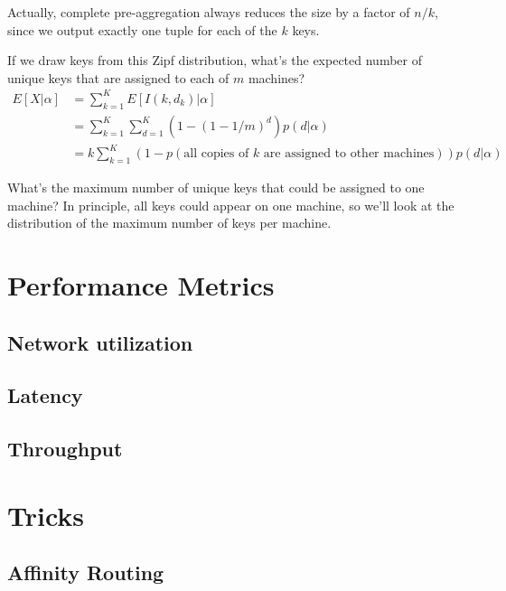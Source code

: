 \documentclass[12pt]{article}
\begin{document}
Actually, complete pre-aggregation always reduces the size by a factor of $n/k$, since we output exactly one tuple for each of the $k$ keys.


If we draw keys from this Zipf distribution, what's the expected number of unique keys that are assigned to each of $m$ machines?
\begin{align*}
    E[X|\alpha] &= \sum_{k=1}^K E[I(k, d_k) | \alpha]
\\              &= \sum_{k=1}^K \sum_{d=1}^K \left(1 - \left(1 - 1/m\right)^d\right)p(d | \alpha)
\\              &= k \sum_{k=1}^K\left(1 - p\left(\text{all copies of $k$ are assigned to other machines}\right)\right) p(d | \alpha)
\end{align*}

What's the maximum number of unique keys that could be assigned to one machine?  In principle, all keys could appear on one machine, so we'll look at the distribution of the maximum number of keys per machine.

\section{Performance Metrics}

\subsection{Network utilization}

\subsection{Latency}

\subsection{Throughput}


\pagebreak
\section{Tricks}

\subsection{Affinity Routing}
\end{document}
